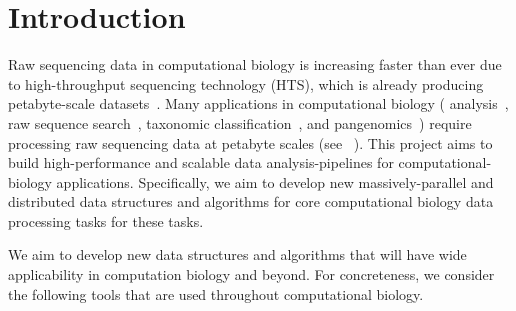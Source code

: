 

\section{Introduction}
\label{intro}





Raw sequencing data in computational biology is increasing faster than ever
due to high-throughput sequencing technology (HTS), which is already producing
petabyte-scale datasets~\cite{kodama2012sequence}. Many applications in computational biology (\kmer
analysis~\cite{MarccaisKi11}, raw sequence search~\cite{SolomonKi16}, taxonomic classification~\cite{wood2014kraken}, and pangenomics~\cite{computational2018computational})
require processing raw sequencing data at petabyte scales (see ~). This project aims to
build high-performance and scalable data analysis-pipelines for computational-biology applications.
Specifically, we aim to develop new massively-parallel and distributed data structures and algorithms for core computational biology data processing tasks for these tasks.


We aim to develop new data structures and algorithms that will have wide applicability in computation biology and beyond. For concreteness, we consider the following tools that are used throughout computational biology.

